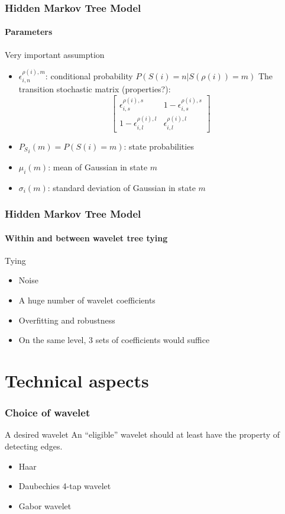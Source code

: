 \documentclass[12pt]{beamer}
\begin{document}
\begin{frame}
  \frametitle{Hidden Markov Tree Model}
  \framesubtitle{Parameters}
  
  \begin{block}{Very important assumption}
  \begin{itemize}
    \item $\epsilon^{\rho(i), m}_{i, n} $: conditional probability $P(S(i) = n |
    S(\rho(i)) = m)$ The transition stochastic matrix (properties?):
     $$ \begin{bmatrix}
       \epsilon^{\rho(i), s}_{i, s} & 1 - \epsilon^{\rho(i), s}_{i, s} \\
       1 - \epsilon^{\rho(i), l}_{i, l} & \epsilon^{\rho(i), l}_{i, l}
     \end{bmatrix} $$
    \item ${P_S}_i(m) = P(S(i) = m)$: state probabilities
    \item $\mu_i(m)$: mean of Gaussian in state $m$
    \item $\sigma_i(m)$: standard deviation of Gaussian in state $m$
  \end{itemize}  	
  \end{block}
\end{frame}
  
\begin{frame}
  \frametitle{Hidden Markov Tree Model}
  \framesubtitle{Within and between wavelet tree tying}
  
  \begin{block}{Tying}
  \begin{itemize}
    \item Noise
    \item A huge number of wavelet coefficients
    \item Overfitting and robustness
    \item On the same level, $3$ sets of coefficients would suffice
  \end{itemize}  	
  \end{block}
 
\end{frame}

\section{Technical aspects}
\begin{frame}
  \frametitle{Choice of wavelet}

  \begin{block}{A desired wavelet}
  An ``eligible'' wavelet should at least have the property of detecting edges.
  \begin{itemize}
    \item Haar
    \item Daubechies 4-tap wavelet
    \item Gabor wavelet
  \end{itemize}
  \end{block}
\end{frame}
\end{document}
